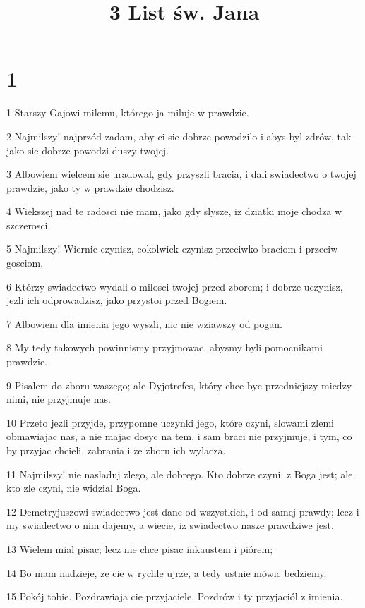 

\title{3 List św. Jana}


\chapter{1}

\par 1 Starszy Gajowi milemu, którego ja miluje w prawdzie.
\par 2 Najmilszy! najprzód zadam, aby ci sie dobrze powodzilo i abys byl zdrów, tak jako sie dobrze powodzi duszy twojej.
\par 3 Albowiem wielcem sie uradowal, gdy przyszli bracia, i dali swiadectwo o twojej prawdzie, jako ty w prawdzie chodzisz.
\par 4 Wiekszej nad te radosci nie mam, jako gdy slysze, iz dziatki moje chodza w szczerosci.
\par 5 Najmilszy! Wiernie czynisz, cokolwiek czynisz przeciwko braciom i przeciw gosciom,
\par 6 Którzy swiadectwo wydali o milosci twojej przed zborem; i dobrze uczynisz, jezli ich odprowadzisz, jako przystoi przed Bogiem.
\par 7 Albowiem dla imienia jego wyszli, nic nie wziawszy od pogan.
\par 8 My tedy takowych powinnismy przyjmowac, abysmy byli pomocnikami prawdzie.
\par 9 Pisalem do zboru waszego; ale Dyjotrefes, który chce byc przedniejszy miedzy nimi, nie przyjmuje nas.
\par 10 Przeto jezli przyjde, przypomne uczynki jego, które czyni, slowami zlemi obmawiajac nas, a nie majac dosyc na tem, i sam braci nie przyjmuje, i tym, co by przyjac chcieli, zabrania i ze zboru ich wylacza.
\par 11 Najmilszy! nie nasladuj zlego, ale dobrego. Kto dobrze czyni, z Boga jest; ale kto zle czyni, nie widzial Boga.
\par 12 Demetryjuszowi swiadectwo jest dane od wszystkich, i od samej prawdy; lecz i my swiadectwo o nim dajemy, a wiecie, iz swiadectwo nasze prawdziwe jest.
\par 13 Wielem mial pisac; lecz nie chce pisac inkaustem i piórem;
\par 14 Bo mam nadzieje, ze cie w rychle ujrze, a tedy ustnie mówic bedziemy.
\par 15 Pokój tobie. Pozdrawiaja cie przyjaciele. Pozdrów i ty przyjaciól z imienia.


